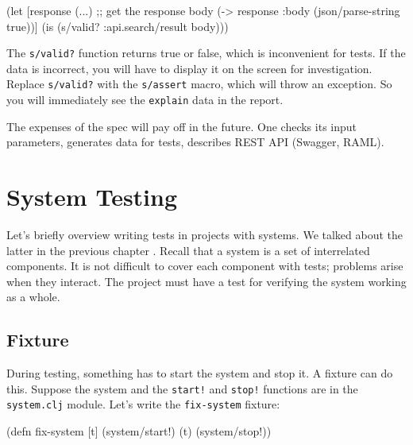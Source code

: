 \else

\begin{english}
  \begin{clojure}
(let [response (...) ;; get the response
      body (-> response :body (json/parse-string true))]
  (is (s/valid? :api.search/result body)))
  \end{clojure}
\end{english}

\fi

The \verb|s/valid?| function returns true or false, which is inconvenient for tests. If the data is incorrect, you will have to display it on the screen for investigation. Replace \verb|s/valid?| with the \verb|s/assert| macro, which will throw an exception. So you will immediately see the \verb|explain| data in the report.


The expenses of the spec will pay off in the future. One checks its input parameters, generates data for tests, describes REST API (Swagger, RAML).

\section{System Testing}


Let's briefly overview writing tests in projects with systems. We talked about the latter in the previous chapter . Recall that a system is a set of interrelated components. It is not difficult to cover each component with tests; problems arise when they interact. The project must have a test for verifying the system working as a whole.

\subsection{Fixture}


During testing, something has to start the system and stop it. A fixture can do this. Suppose the system and the \verb|start!| and \verb|stop!| functions are in the \verb|system.clj| module. Let's write the \verb|fix-system| fixture:

\begin{english}
  \begin{clojure}
(defn fix-system
  [t]
  (system/start!)
  (t)
  (system/stop!))
  \end{clojure}
\end{english}

